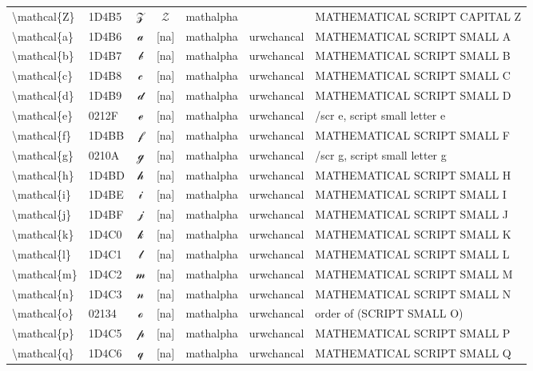 \documentclass[a4paper,landscape]{article}
\begin{document}
\begin{longtable}{llcclll}
\textbackslash{}mathcal\{Z\} & 1D4B5 & 𝒵 & $\mathcal{Z}$ & mathalpha &  & MATHEMATICAL SCRIPT CAPITAL Z \\
\textbackslash{}mathcal\{a\} & 1D4B6 & 𝒶 & [na] & mathalpha & urwchancal & MATHEMATICAL SCRIPT SMALL A \\
\textbackslash{}mathcal\{b\} & 1D4B7 & 𝒷 & [na] & mathalpha & urwchancal & MATHEMATICAL SCRIPT SMALL B \\
\textbackslash{}mathcal\{c\} & 1D4B8 & 𝒸 & [na] & mathalpha & urwchancal & MATHEMATICAL SCRIPT SMALL C \\
\textbackslash{}mathcal\{d\} & 1D4B9 & 𝒹 & [na] & mathalpha & urwchancal & MATHEMATICAL SCRIPT SMALL D \\
\textbackslash{}mathcal\{e\} & 0212F & ℯ & [na] & mathalpha & urwchancal & /scr e, script small letter e \\
\textbackslash{}mathcal\{f\} & 1D4BB & 𝒻 & [na] & mathalpha & urwchancal & MATHEMATICAL SCRIPT SMALL F \\
\textbackslash{}mathcal\{g\} & 0210A & ℊ & [na] & mathalpha & urwchancal & /scr g, script small letter g \\
\textbackslash{}mathcal\{h\} & 1D4BD & 𝒽 & [na] & mathalpha & urwchancal & MATHEMATICAL SCRIPT SMALL H \\
\textbackslash{}mathcal\{i\} & 1D4BE & 𝒾 & [na] & mathalpha & urwchancal & MATHEMATICAL SCRIPT SMALL I \\
\textbackslash{}mathcal\{j\} & 1D4BF & 𝒿 & [na] & mathalpha & urwchancal & MATHEMATICAL SCRIPT SMALL J \\
\textbackslash{}mathcal\{k\} & 1D4C0 & 𝓀 & [na] & mathalpha & urwchancal & MATHEMATICAL SCRIPT SMALL K \\
\textbackslash{}mathcal\{l\} & 1D4C1 & 𝓁 & [na] & mathalpha & urwchancal & MATHEMATICAL SCRIPT SMALL L \\
\textbackslash{}mathcal\{m\} & 1D4C2 & 𝓂 & [na] & mathalpha & urwchancal & MATHEMATICAL SCRIPT SMALL M \\
\textbackslash{}mathcal\{n\} & 1D4C3 & 𝓃 & [na] & mathalpha & urwchancal & MATHEMATICAL SCRIPT SMALL N \\
\textbackslash{}mathcal\{o\} & 02134 & ℴ & [na] & mathalpha & urwchancal & order of (SCRIPT SMALL O) \\
\textbackslash{}mathcal\{p\} & 1D4C5 & 𝓅 & [na] & mathalpha & urwchancal & MATHEMATICAL SCRIPT SMALL P \\
\textbackslash{}mathcal\{q\} & 1D4C6 & 𝓆 & [na] & mathalpha & urwchancal & MATHEMATICAL SCRIPT SMALL Q \\

\end{longtable}
\end{document}
